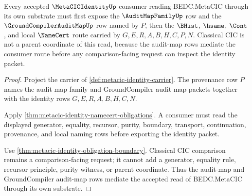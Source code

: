 \begin{theorem}
\label{thm:metacic-identity-audit-map-route}
Every accepted $\MetaCICIdentityUp$ consumer reading BEDC.MetaCIC through its own substrate must first expose the $\AuditMapFamilyUp$ row and the $\GroundCompilerAuditMapUp$ row named by $P$, then the $\BHist$, $\hsame$, $\Cont$, and local $\NameCert$ route carried by $G,E,R,A,B,H,C,P,N$. Classical CIC is not a parent coordinate of this read, because the audit-map rows mediate the consumer route before any comparison-facing request can inspect the identity packet.
\end{theorem}
\begin{proof}
Project the carrier of \autoref{def:metacic-identity-carrier}. The provenance row $P$ names the audit-map family and GroundCompiler audit-map packets together with the identity rows $G,E,R,A,B,H,C,N$.

Apply \autoref{thm:metacic-identity-namecert-obligations}. A consumer must read the displayed generator, equality, recursor, purity, boundary, transport, continuation, provenance, and local naming rows before exporting the identity packet.

Use \autoref{thm:metacic-identity-obligation-boundary}. Classical CIC comparison remains a comparison-facing request; it cannot add a generator, equality rule, recursor principle, purity witness, or parent coordinate. Thus the audit-map and GroundCompiler audit-map rows mediate the accepted read of BEDC.MetaCIC through its own substrate.
\end{proof}


\begin{closurestatus}{\MetaCICIdentityUp}
  \theoryclosure{\seedClosure}
  \formalstatus{\unformalizedV}
\end{closurestatus}
